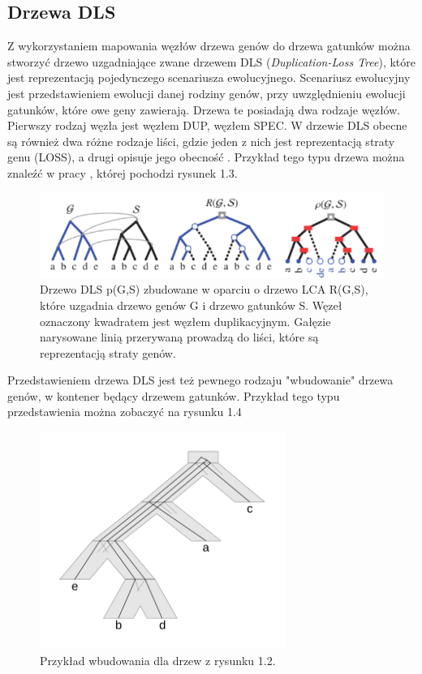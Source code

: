\documentclass[licencjacka]{pracamgr}
\begin{document}
\subsection{Drzewa DLS}

Z wykorzystaniem mapowania węzłów drzewa genów do drzewa gatunków można stworzyć drzewo uzgadniające zwane drzewem DLS (\textit{Duplication-Loss Tree}), które jest reprezentacją pojedynczego scenariusza ewolucyjnego. Scenariusz ewolucyjny jest przedstawieniem ewolucji danej rodziny genów, przy uwzględnieniu ewolucji gatunków, które owe geny zawierają. Drzewa te posiadają dwa rodzaje węzłów. Pierwszy rodzaj węzła jest węzłem DUP, węzłem SPEC. W drzewie DLS obecne są również dwa różne rodzaje liści, gdzie jeden z nich jest reprezentacją straty genu (LOSS), a drugi opisuje jego obecność \cite{doktorat_paszek}. Przykład tego typu drzewa można znaleźć w pracy \cite{dls} , której pochodzi rysunek 1.3.


\begin{figure}[H]
  \centering
  \includegraphics[width=120mm]{./pictures/DLS.png}
  \caption{Drzewo DLS p(G,S) zbudowane w oparciu o drzewo LCA R(G,S), które uzgadnia drzewo genów G i drzewo gatunków S. Węzeł oznaczony kwadratem jest węzłem duplikacyjnym. Gałęzie narysowane linią przerywaną prowadzą do liści, które są reprezentacją straty genów.}
\end{figure}


Przedstawieniem drzewa DLS jest też pewnego rodzaju "wbudowanie" drzewa genów, w kontener będący drzewem gatunków. Przykład tego typu przedstawienia można zobaczyć na rysunku 1.4 


\begin{figure}[H]
  \centering
  \includegraphics[width=80mm]{./pictures/optscen.png}
  \caption{Przykład wbudowania dla drzew z rysunku 1.2.}
\end{figure}
\end{document}
